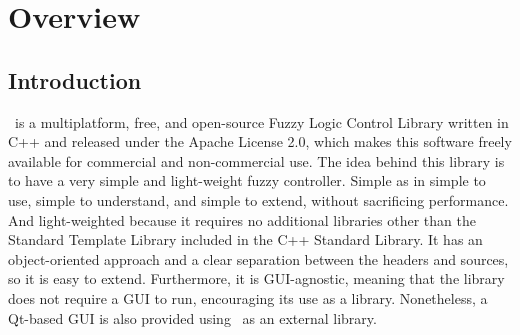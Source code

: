 \chapter{Overview}

\section{Introduction}

\fl\ is a multiplatform, free, and open-source Fuzzy Logic Control Library written in C++ and released under the Apache License 2.0, which makes this software freely available for commercial and non-commercial use. The idea behind this library is to have a very simple and light-weight fuzzy controller. Simple as in simple to use, simple to understand, and simple to extend, without sacrificing performance. And light-weighted because it requires no additional libraries other than the Standard Template Library included in the C++ Standard Library. It has an object-oriented approach and a clear separation between the headers and sources, so it is easy to extend. Furthermore, it is GUI-agnostic, meaning that the library does not require a GUI to run, encouraging its use as a library. Nonetheless, a Qt-based GUI is also provided using \fl\ as an external library.


